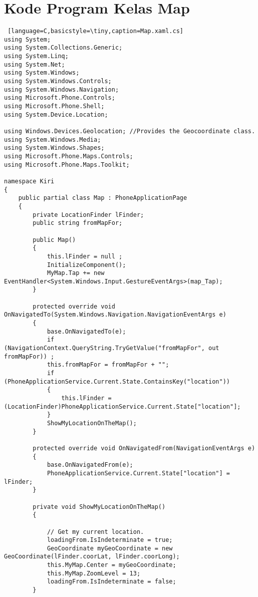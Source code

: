 \chapter{Kode Program Kelas Map}
\label{app:B}

\singlespacing 

\begin{lstlisting} [language=C,basicstyle=\tiny,caption=Map.xaml.cs]
using System;
using System.Collections.Generic;
using System.Linq;
using System.Net;
using System.Windows;
using System.Windows.Controls;
using System.Windows.Navigation;
using Microsoft.Phone.Controls;
using Microsoft.Phone.Shell;
using System.Device.Location;

using Windows.Devices.Geolocation; //Provides the Geocoordinate class.
using System.Windows.Media;
using System.Windows.Shapes;
using Microsoft.Phone.Maps.Controls;
using Microsoft.Phone.Maps.Toolkit;

namespace Kiri
{
    public partial class Map : PhoneApplicationPage
    {
        private LocationFinder lFinder;
        public string fromMapFor;

        public Map()
        {
            this.lFinder = null ;
            InitializeComponent();
            MyMap.Tap += new EventHandler<System.Windows.Input.GestureEventArgs>(map_Tap);
        }

        protected override void OnNavigatedTo(System.Windows.Navigation.NavigationEventArgs e)
        {
            base.OnNavigatedTo(e);
            if (NavigationContext.QueryString.TryGetValue("fromMapFor", out fromMapFor)) ;
            this.fromMapFor = fromMapFor + "";
            if (PhoneApplicationService.Current.State.ContainsKey("location"))
            {
                this.lFinder = (LocationFinder)PhoneApplicationService.Current.State["location"];
            }
            ShowMyLocationOnTheMap();
        }

        protected override void OnNavigatedFrom(NavigationEventArgs e)
        {
            base.OnNavigatedFrom(e);
            PhoneApplicationService.Current.State["location"] = lFinder;
        }

        private void ShowMyLocationOnTheMap()
        {

            // Get my current location.
            loadingFrom.IsIndeterminate = true;
            GeoCoordinate myGeoCoordinate = new GeoCoordinate(lFinder.coorLat, lFinder.coorLong);
            this.MyMap.Center = myGeoCoordinate;
            this.MyMap.ZoomLevel = 13;
            loadingFrom.IsIndeterminate = false;
        }


\end{lstlisting}
